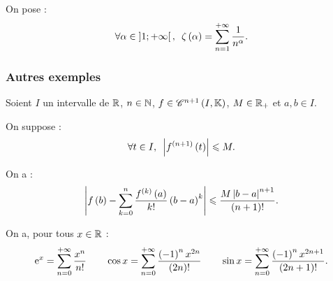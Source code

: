 \begin{nota}
On pose : \[\quantifs{\forall\alpha\in\intervee{1}{\pinf}}\zeta\paren{\alpha}=\sum_{n=1}^{\pinf}\dfrac{1}{n^\alpha}.\]
\end{nota}

\subsubsection{Autres exemples}

\begin{rappel}
Soient \(I\) un intervalle de \(\mathbb{R}\), \(n\in\mathbb{N}\), \(f\in\mathscr{C}^{n+1}\left(I,\mathbb{K}\right)\), \(M\in\mathbb{R}_+\) et \(a,b\in I\).

On suppose : \[\quantifs{\forall t\in I}\abs{f\deriv{n+1}\paren{t}}\leq M.\]

On a : \[\left\lvert f\left(b\right)-\sum_{k=0}^n\dfrac{f^{\left(k\right)}\left(a\right)}{k!}\left(b-a\right)^k\right\rvert\leqslant\dfrac{M\left\lvert b-a\right\rvert^{n+1}}{\left(n+1\right)!}.\]
\end{rappel}

\begin{prop}
On a, pour tous \(x\in\mathbb{R}\) : \[\mathrm{e}^{x}=\sum_{n=0}^{+\infty}\dfrac{x^n}{n!}\qquad\cos x=\sum_{n=0}^{+\infty}\dfrac{\left(-1\right)^nx^{2n}}{\left(2n\right)!}\qquad\sin x=\sum_{n=0}^{+\infty}\dfrac{\left(-1\right)^nx^{2n+1}}{\left(2n+1\right)!}.\]
\end{prop}

